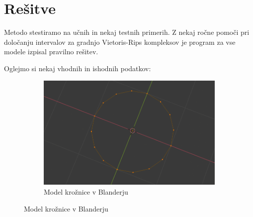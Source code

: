 \documentclass[a4paper,11pt]{article}
\begin{document}
\section{Rešitve}
Metodo stestiramo na učnih in nekaj testnih primerih. Z nekaj ročne pomoči pri določanju intervalov za gradnjo Vietoris-Rips kompleksov je program za vse modele izpisal pravilno rešitev. \par
Oglejmo si nekaj vhodnih in ishodnih podatkov:
    \begin{figure}[h!]
        \centering
        \begin{subfigure}[b]{0.4\linewidth}
          \includegraphics[width=\linewidth]{circle.png}
          \caption{Model krožnice v Blanderju}
        \end{subfigure}
        

\end{figure}
\end{document}
